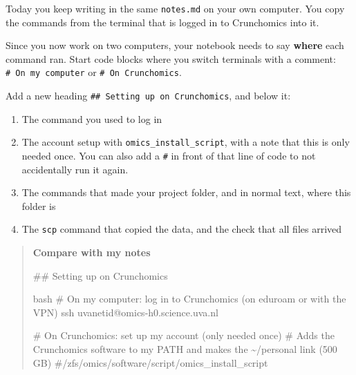 \documentclass[
  letterpaper,
  DIV=11,
  numbers=noendperiod]{scrreprt}
\newenvironment{Shaded}{}{}
\newcommand{\CommentTok}[1]{\textcolor[rgb]{0.42,0.45,0.49}{#1}}
\newcommand{\FunctionTok}[1]{\textcolor[rgb]{0.44,0.26,0.76}{#1}}
\newcommand{\InformationTok}[1]{\textcolor[rgb]{0.42,0.45,0.49}{#1}}
\newcommand{\NormalTok}[1]{\textcolor[rgb]{0.14,0.16,0.18}{#1}}
\providecommand{\tightlist}{%
  \setlength{\itemsep}{0pt}\setlength{\parskip}{0pt}}
\begin{document}
\begin{tcolorbox}[enhanced jigsaw, colbacktitle=quarto-callout-color!10!white, rightrule=.15mm, leftrule=.75mm, colback=white, opacitybacktitle=0.6, title=\textcolor{quarto-callout-color}{\faInfo}\hspace{0.5em}{Notebook checkpoint: Setting up on Crunchomics}, bottomrule=.15mm, left=2mm, colframe=quarto-callout-color-frame, opacityback=0, breakable, bottomtitle=1mm, coltitle=black, arc=.35mm, toprule=.15mm, toptitle=1mm, titlerule=0mm]

Today you keep writing in the same \texttt{notes.md} on your own
computer. You copy the commands from the terminal that is logged in to
Crunchomics into it.

Since you now work on two computers, your notebook needs to say
\textbf{where} each command ran. Start code blocks where you switch
terminals with a comment: \texttt{\#\ On\ my\ computer} or
\texttt{\#\ On\ Crunchomics}.

Add a new heading \texttt{\#\#\ Setting\ up\ on\ Crunchomics}, and below
it:

\begin{enumerate}
\def\labelenumi{\arabic{enumi}.}
\tightlist
\item
  The command you used to log in
\item
  The account setup with \texttt{omics\_install\_script}, with a note
  that this is only needed once. You can also add a \texttt{\#} in front
  of that line of code to not accidentally run it again.
\item
  The commands that made your project folder, and in normal text, where
  this folder is
\item
  The \texttt{scp} command that copied the data, and the check that all
  files arrived
\end{enumerate}

\begin{quote}
\textbf{Compare with my notes}

\begin{Shaded}
\begin{Highlighting}[]
\FunctionTok{\#\# Setting up on Crunchomics}

\InformationTok{\textasciigrave{}\textasciigrave{}\textasciigrave{}bash}
\CommentTok{\# On my computer: log in to Crunchomics (on eduroam or with the VPN)}
\FunctionTok{ssh}\NormalTok{ uvanetid@omics{-}h0.science.uva.nl}

\CommentTok{\# On Crunchomics: set up my account (only needed once)}
\CommentTok{\# Adds the Crunchomics software to my PATH and makes the \textasciitilde{}/personal link (500 GB)}
\CommentTok{\#/zfs/omics/software/script/omics\_install\_script}


\end{Highlighting}
\end{Shaded}
\end{quote}
\end{tcolorbox}
\end{document}
